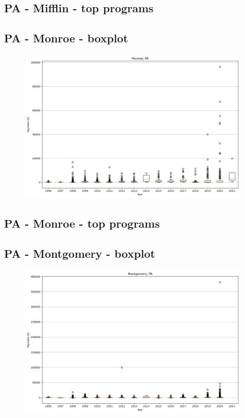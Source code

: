 \subsection*{PA - Mifflin - top programs}

\newpage
\subsection*{PA - Monroe - boxplot}
\begin{figure}[h]
\centering
\includegraphics[width=7in]{../output/boxplots/counties/Monroe-PA_boxplot.png}
\end{figure}


\subsection*{PA - Monroe - top programs}

\newpage
\subsection*{PA - Montgomery - boxplot}
\begin{figure}[h]
\centering
\includegraphics[width=7in]{../output/boxplots/counties/Montgomery-PA_boxplot.png}
\end{figure}


